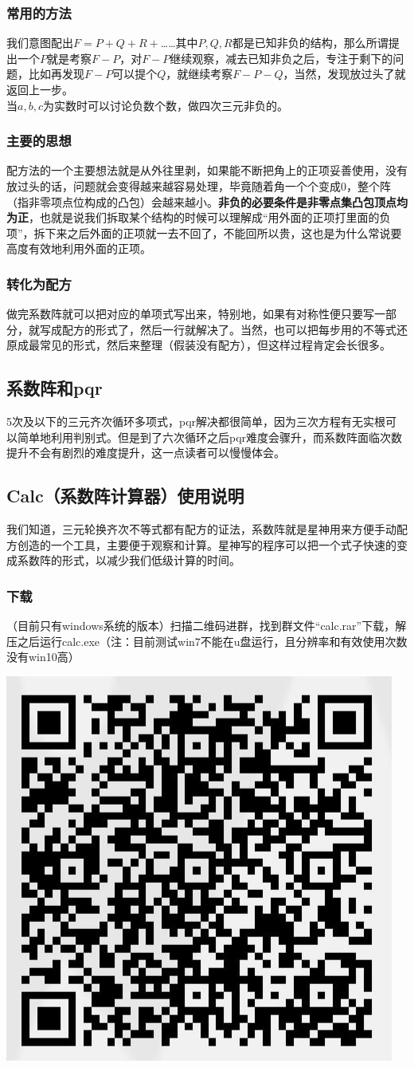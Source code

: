 \documentclass[UTF8]{ctexart}
\begin{document}
\subsubsection{常用的方法}
我们意图配出$ F=P+Q+R+ $……其中$ P,Q,R $都是已知非负的结构，那么所谓提出一个$ P $就是考察$ F-P $，对$ F-P $继续观察，减去已知非负之后，专注于剩下的问题，比如再发现$ F-P $可以提个$ Q $，就继续考察$ F-P-Q $，当然，发现放过头了就返回上一步。\\
当$ a,b,c $为实数时可以讨论负数个数，做四次三元非负的。
\subsubsection{主要的思想}
配方法的一个主要想法就是从外往里剥，如果能不断把角上的正项妥善使用，没有放过头的话，问题就会变得越来越容易处理，毕竟随着角一个个变成0，整个阵（指非零项点位构成的凸包）会越来越小。\textbf{非负的必要条件是非零点集凸包顶点均为正}，也就是说我们拆取某个结构的时候可以理解成“用外面的正项打里面的负项”，拆下来之后外面的正项就一去不回了，不能回所以贵，这也是为什么常说要高度有效地利用外面的正项。
\subsubsection{转化为配方}
做完系数阵就可以把对应的单项式写出来，特别地，如果有对称性便只要写一部分，就写成配方的形式了，然后一行就解决了。当然，也可以把每步用的不等式还原成最常见的形式，然后来整理（假装没有配方），但这样过程肯定会长很多。
\subsection{系数阵和pqr}
5次及以下的三元齐次循环多项式，pqr解决都很简单，因为三次方程有无实根可以简单地利用判别式。但是到了六次循环之后pqr难度会骤升，而系数阵面临次数提升不会有剧烈的难度提升，这一点读者可以慢慢体会。
\subsection{Calc（系数阵计算器）使用说明}
我们知道，三元轮换齐次不等式都有配方的证法，系数阵就是星神用来方便手动配方创造的一个工具，主要便于观察和计算。星神写的程序可以把一个式子快速的变成系数阵的形式，以减少我们低级计算的时间。
\subsubsection{下载}
（目前只有windows系统的版本）扫描二维码进群，找到群文件“calc.rar”下载，解压之后运行calc.exe（注：目前测试win7不能在u盘运行，且分辨率和有效使用次数没有win10高）
\begin{center}
	\includegraphics[width=0.25\linewidth]{0010}
\end{center}
\end{document}
